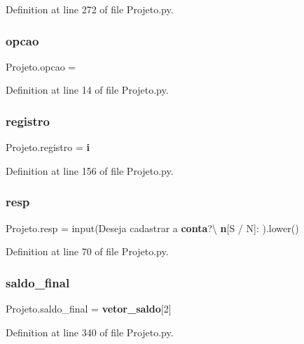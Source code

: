 Definition at line 272 of file Projeto.\+py.

\mbox{\label{namespace_projeto_afce8999e26d2323f139c03feb10f527f}} 
\subsubsection{opcao}
{\footnotesize\ttfamily Projeto.\+opcao = \textquotesingle{}\textquotesingle{}}



Definition at line 14 of file Projeto.\+py.

\mbox{\label{namespace_projeto_a7c6cb7a55065e95a923b95b63eb96521}} 
\subsubsection{registro}
{\footnotesize\ttfamily Projeto.\+registro = \textbf{ i}}



Definition at line 156 of file Projeto.\+py.

\mbox{\label{namespace_projeto_aafba3427340b2f5613c64f3125886ddc}} 
\subsubsection{resp}
{\footnotesize\ttfamily Projeto.\+resp = input(\textquotesingle{}Deseja cadastrar a \textbf{ conta}?\textbackslash{}\textbf{ n}[S / N]\+: \textquotesingle{}).lower()}



Definition at line 70 of file Projeto.\+py.

\mbox{\label{namespace_projeto_ad32e20ef172f2f954441ef6b416fe6f5}} 
\subsubsection{saldo\_final}
{\footnotesize\ttfamily Projeto.\+saldo\+\_\+final = \textbf{ vetor\+\_\+saldo}[2]}



Definition at line 340 of file Projeto.\+py.

\mbox{\label{namespace_projeto_af4086a80d2833a3590173bdae1f44d86}} 
